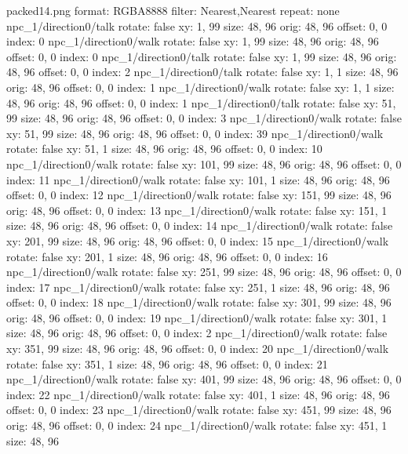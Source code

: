 packed14.png
format: RGBA8888
filter: Nearest,Nearest
repeat: none
npc_1/direction0/talk
  rotate: false
  xy: 1, 99
  size: 48, 96
  orig: 48, 96
  offset: 0, 0
  index: 0
npc_1/direction0/walk
  rotate: false
  xy: 1, 99
  size: 48, 96
  orig: 48, 96
  offset: 0, 0
  index: 0
npc_1/direction0/talk
  rotate: false
  xy: 1, 99
  size: 48, 96
  orig: 48, 96
  offset: 0, 0
  index: 2
npc_1/direction0/talk
  rotate: false
  xy: 1, 1
  size: 48, 96
  orig: 48, 96
  offset: 0, 0
  index: 1
npc_1/direction0/walk
  rotate: false
  xy: 1, 1
  size: 48, 96
  orig: 48, 96
  offset: 0, 0
  index: 1
npc_1/direction0/talk
  rotate: false
  xy: 51, 99
  size: 48, 96
  orig: 48, 96
  offset: 0, 0
  index: 3
npc_1/direction0/walk
  rotate: false
  xy: 51, 99
  size: 48, 96
  orig: 48, 96
  offset: 0, 0
  index: 39
npc_1/direction0/walk
  rotate: false
  xy: 51, 1
  size: 48, 96
  orig: 48, 96
  offset: 0, 0
  index: 10
npc_1/direction0/walk
  rotate: false
  xy: 101, 99
  size: 48, 96
  orig: 48, 96
  offset: 0, 0
  index: 11
npc_1/direction0/walk
  rotate: false
  xy: 101, 1
  size: 48, 96
  orig: 48, 96
  offset: 0, 0
  index: 12
npc_1/direction0/walk
  rotate: false
  xy: 151, 99
  size: 48, 96
  orig: 48, 96
  offset: 0, 0
  index: 13
npc_1/direction0/walk
  rotate: false
  xy: 151, 1
  size: 48, 96
  orig: 48, 96
  offset: 0, 0
  index: 14
npc_1/direction0/walk
  rotate: false
  xy: 201, 99
  size: 48, 96
  orig: 48, 96
  offset: 0, 0
  index: 15
npc_1/direction0/walk
  rotate: false
  xy: 201, 1
  size: 48, 96
  orig: 48, 96
  offset: 0, 0
  index: 16
npc_1/direction0/walk
  rotate: false
  xy: 251, 99
  size: 48, 96
  orig: 48, 96
  offset: 0, 0
  index: 17
npc_1/direction0/walk
  rotate: false
  xy: 251, 1
  size: 48, 96
  orig: 48, 96
  offset: 0, 0
  index: 18
npc_1/direction0/walk
  rotate: false
  xy: 301, 99
  size: 48, 96
  orig: 48, 96
  offset: 0, 0
  index: 19
npc_1/direction0/walk
  rotate: false
  xy: 301, 1
  size: 48, 96
  orig: 48, 96
  offset: 0, 0
  index: 2
npc_1/direction0/walk
  rotate: false
  xy: 351, 99
  size: 48, 96
  orig: 48, 96
  offset: 0, 0
  index: 20
npc_1/direction0/walk
  rotate: false
  xy: 351, 1
  size: 48, 96
  orig: 48, 96
  offset: 0, 0
  index: 21
npc_1/direction0/walk
  rotate: false
  xy: 401, 99
  size: 48, 96
  orig: 48, 96
  offset: 0, 0
  index: 22
npc_1/direction0/walk
  rotate: false
  xy: 401, 1
  size: 48, 96
  orig: 48, 96
  offset: 0, 0
  index: 23
npc_1/direction0/walk
  rotate: false
  xy: 451, 99
  size: 48, 96
  orig: 48, 96
  offset: 0, 0
  index: 24
npc_1/direction0/walk
  rotate: false
  xy: 451, 1
  size: 48, 96
